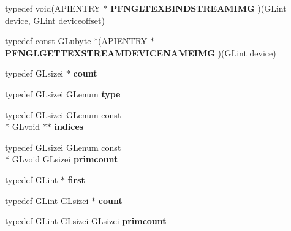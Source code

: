 \begin{DoxyCompactItemize}
\item 
\hypertarget{class_c_p_v_r_tgles_ext_ad9d0d57e5acbd79e7c2954f9b6d2e713}{typedef void(A\+P\+I\+E\+N\+T\+R\+Y $\ast$ {\bfseries P\+F\+N\+G\+L\+T\+E\+X\+B\+I\+N\+D\+S\+T\+R\+E\+A\+M\+I\+M\+G} )(G\+Lint device, G\+Lint deviceoffset)}\label{class_c_p_v_r_tgles_ext_ad9d0d57e5acbd79e7c2954f9b6d2e713}

\item 
\hypertarget{class_c_p_v_r_tgles_ext_a376b5c4e1ef27ec22fc1af2e339b61fc}{typedef const G\+Lubyte $\ast$(A\+P\+I\+E\+N\+T\+R\+Y $\ast$ {\bfseries P\+F\+N\+G\+L\+G\+E\+T\+T\+E\+X\+S\+T\+R\+E\+A\+M\+D\+E\+V\+I\+C\+E\+N\+A\+M\+E\+I\+M\+G} )(G\+Lint device)}\label{class_c_p_v_r_tgles_ext_a376b5c4e1ef27ec22fc1af2e339b61fc}

\item 
\hypertarget{class_c_p_v_r_tgles_ext_ade312bd83c507757b1ef2ac152c8df8e}{typedef G\+Lsizei $\ast$ {\bfseries count}}\label{class_c_p_v_r_tgles_ext_ade312bd83c507757b1ef2ac152c8df8e}

\item 
\hypertarget{class_c_p_v_r_tgles_ext_a34e2cbf3f243f82ea192de3790e28e20}{typedef G\+Lsizei G\+Lenum {\bfseries type}}\label{class_c_p_v_r_tgles_ext_a34e2cbf3f243f82ea192de3790e28e20}

\item 
\hypertarget{class_c_p_v_r_tgles_ext_a8aff1899e880c53fb21d69aac4c67239}{typedef G\+Lsizei G\+Lenum const \\*
G\+Lvoid $\ast$$\ast$ {\bfseries indices}}\label{class_c_p_v_r_tgles_ext_a8aff1899e880c53fb21d69aac4c67239}

\item 
\hypertarget{class_c_p_v_r_tgles_ext_aae86975f6d30f5de1f9882dadc4f11e3}{typedef G\+Lsizei G\+Lenum const \\*
G\+Lvoid G\+Lsizei {\bfseries primcount}}\label{class_c_p_v_r_tgles_ext_aae86975f6d30f5de1f9882dadc4f11e3}

\item 
\hypertarget{class_c_p_v_r_tgles_ext_a32df418c4a1c6a7ce12767b8741b92cd}{typedef G\+Lint $\ast$ {\bfseries first}}\label{class_c_p_v_r_tgles_ext_a32df418c4a1c6a7ce12767b8741b92cd}

\item 
\hypertarget{class_c_p_v_r_tgles_ext_a2d1b9f32453a989b1793f9591de4817a}{typedef G\+Lint G\+Lsizei $\ast$ {\bfseries count}}\label{class_c_p_v_r_tgles_ext_a2d1b9f32453a989b1793f9591de4817a}

\item 
\hypertarget{class_c_p_v_r_tgles_ext_af670f88a6847dd2becb07be264d6fdbb}{typedef G\+Lint G\+Lsizei G\+Lsizei {\bfseries primcount}}\label{class_c_p_v_r_tgles_ext_af670f88a6847dd2becb07be264d6fdbb}


\end{DoxyCompactItemize}
